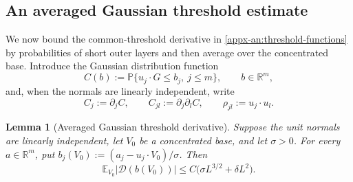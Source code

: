 \documentclass[11pt,letterpaper]{article}
\newtheorem{lemma}{Lemma}
\theoremstyle{remark}
\newcommand{\E}{\mathbb E}
\newcommand{\Pp}{\mathbb P}
\newcommand{\R}{\mathbb R}
\begin{document}
\subsection{An averaged Gaussian threshold estimate}
\label{appx-an:sec:threshold}

We now bound the common-threshold derivative in
\eqref{appx-an:threshold-functions} by probabilities of short outer
layers and then average over the concentrated base. Introduce the
Gaussian distribution function
\[
 C(b):=\Pp\{u_j\cdot G\le b_j,\ j\le m\},\qquad b\in\R^m,
\]
and, when the normals are linearly independent, write
\[
 C_j:=\partial_jC,\qquad C_{jl}:=\partial_j\partial_lC,
 \qquad \rho_{jl}:=u_j\cdot u_l.
\]

\begin{lemma}[Averaged Gaussian threshold derivative]
\label{appx-an:lem:threshold}
Suppose the unit normals are linearly independent, let \(V_0\) be a
concentrated base, and let \(\sigma>0\). For every \(a\in\R^m\), put
\(b_j(V_0):=(a_j-u_j\cdot V_0)/\sigma\). Then
\begin{equation}
 \E_{V_0}|\mathcal D(b(V_0))|
 \le C\bigl(\sigma L^{3/2}+\delta L^2\bigr).
 \label{appx-an:threshold-bound}
\end{equation}
\end{lemma}
\end{document}
